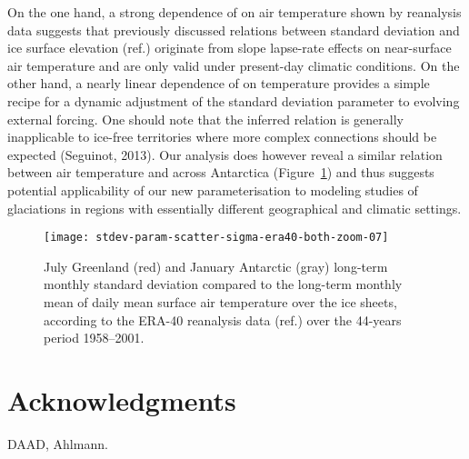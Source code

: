 \documentclass[review]{igs}
\begin{document}
On the one hand, a strong dependence of on air temperature shown by reanalysis data suggests that previously discussed relations between standard deviation and ice surface elevation (ref.) originate from slope lapse-rate effects on near-surface air temperature and are only valid under present-day climatic conditions. On the other hand, a nearly linear dependence of on temperature provides a simple recipe for a dynamic adjustment of the standard deviation parameter to evolving external forcing. One should note that the inferred relation is generally inapplicable to ice-free territories where more complex connections should be expected (Seguinot, 2013). Our analysis does however reveal a similar relation between air temperature and across Antarctica (Figure~\ref{fig:both}) and thus suggests potential applicability of our new parameterisation to modeling studies of glaciations in regions with essentially different geographical and climatic settings.

\begin{figure}
    \centering\texttt{[image: stdev-param-scatter-sigma-era40-both-zoom-07]}
    \caption{July Greenland (red) and January Antarctic (gray) long-term monthly standard deviation compared to the long-term monthly mean of daily mean surface air temperature over the ice sheets, according to the ERA-40 reanalysis data (ref.) over the 44-years period 1958–2001.}
    \label{fig:both}
\end{figure}


\section{Acknowledgments}

DAAD, Ahlmann.



\end{document}
